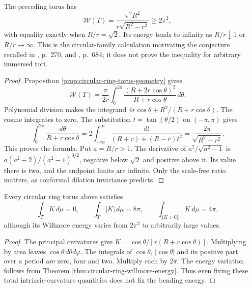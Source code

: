 \begin{theorem}\label{thm:circular-ring-willmore-energy}
The preceding torus has
\[
 \mathcal W(T)=\frac{\pi^2R^2}{r\sqrt{R^2-r^2}}\geq2\pi^2,
\]
with equality exactly when $R/r=\sqrt2$. Its energy tends to infinity as $R/r\downarrow1$ or $R/r\to\infty$. This is the circular-family calculation motivating the conjecture recalled in \cite{LY82}, p.~270, and \cite{MNWill}, p.~684; it does not prove the inequality for arbitrary immersed tori.
\end{theorem}
\begin{proof}
Proposition \ref{prop:circular-ring-torus-geometry} gives
\[
 \mathcal W(T)=\frac{\pi}{2r}\int_0^{2\pi}
 \frac{(R+2r\cos\theta)^2}{R+r\cos\theta}\,d\theta.
\]
Polynomial division makes the integrand $4r\cos\theta+R^2/(R+r\cos\theta)$. The cosine integrates to zero. The substitution $t=\tan(\theta/2)$ on $(-\pi,\pi)$ gives
\[
 \int_0^{2\pi}\frac{d\theta}{R+r\cos\theta}
 =2\int_{-\infty}^{\infty}\frac{dt}{(R+r)+(R-r)t^2}
 =\frac{2\pi}{\sqrt{R^2-r^2}}.
\]
This proves the formula. Put $a=R/r>1$. The derivative of $a^2/\sqrt{a^2-1}$ is $a(a^2-2)/(a^2-1)^{3/2}$, negative below $\sqrt2$ and positive above it. Its value there is two, and the endpoint limits are infinite. Only the scale-free ratio matters, as conformal dilation invariance predicts.
\end{proof}

\begin{example}\label{ex:ring-torus-total-curvature}
Every circular ring torus above satisfies
\[
 \int_TK\,d\mu=0,\qquad \int_T|K|\,d\mu=8\pi,
 \qquad \int_{\{K>0\}}K\,d\mu=4\pi,
\]
although its Willmore energy varies from $2\pi^2$ to arbitrarily large values.
\end{example}
\begin{proof}
The principal curvatures give $K=\cos\theta/[r(R+r\cos\theta)]$. Multiplying by area leaves $\cos\theta\,d\theta d\varphi$. The integrals of $\cos\theta$, $|\cos\theta|$ and its positive part over a period are zero, four and two. Multiply each by $2\pi$. The energy variation follows from Theorem \ref{thm:circular-ring-willmore-energy}. Thus even fixing these total intrinsic-curvature quantities does not fix the bending energy.
\end{proof}

